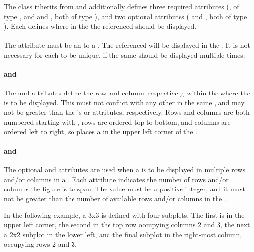 \begin{blockChanged}
\subsubsection{}
\label{class:subPlot}

The \SubPlot class inherits from \SedBase and additionally defines three required attributes (, of type \SIdRef, and  and , both of type ), and two optional attributes ( and , both of type ).  Each \SubPlot defines where in the \Figure the referenced \Plot should be displayed.

\paragraph*{}
The  attribute must be an \SIdRef to a \Plot.  The referenced \Plot will be displayed in the \Figure.  It is not necessary for each  to be unique, if the same \Plot should be displayed multiple times.

\paragraph*{ and }
The  and  attributes define the row and column, respectively, within the \Figure where the \Plot is to be displayed.  This must not conflict with any other \SubPlot in the same \Figure, and may not be greater than the \Figure's  or  attributes, respectively.  Rows and columns are both numbered starting with , rows are ordered top to bottom, and columns are ordered left to right, so  places a \Plot in the upper left corner of the \Figure.

\paragraph*{ and }
The optional  and  attributes are used when a \Plot is to be displayed in multiple rows and/or columns in a \Figure.  Each attribute indicates the number of rows and/or columns the figure is to span.  The value must be a positive integer, and it must not be greater than the number of available rows and/or columns in the \Figure.

In the following example, a 3x3 \Figure is defined with four subplots.  The first is in the upper left corner, the second in the top row occupying columns 2 and 3, the next a 2x2 subplot in the lower left, and the final subplot in the right-most column, occupying rows 2 and 3.


\end{blockChanged}
